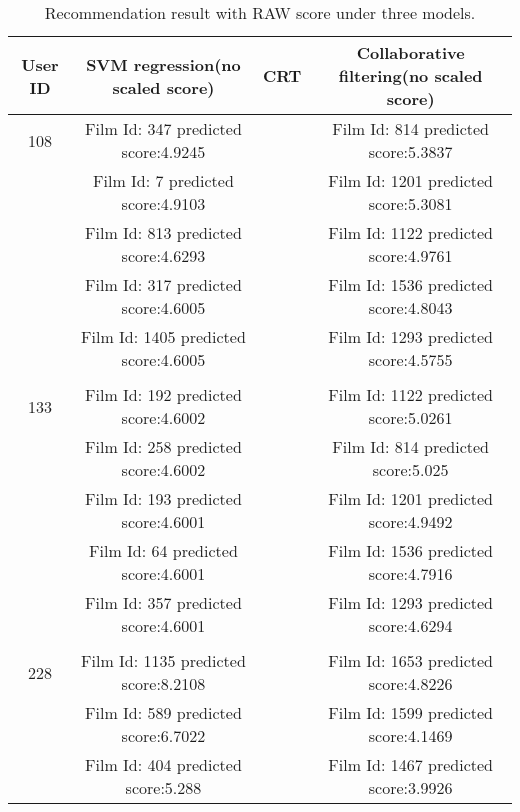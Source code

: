 \begin{longtable}{|c|c|c|c|}
\caption{Recommendation result with RAW score under three models.}\\
\hline
{User ID} & {\bf SVM regression(no scaled score)} & {\bf CRT} & {\bf Collaborative filtering(no scaled score)} \\
\hline
\multicolumn{ 1}{|c|}{108} & Film Id: 347 predicted score:4.9245 &            & Film Id: 814 predicted score:5.3837 \\
\hline
\multicolumn{ 1}{|c|}{} & Film Id: 7 predicted score:4.9103 &            & Film Id: 1201 predicted score:5.3081 \\
\hline
\multicolumn{ 1}{|c|}{} & Film Id: 813 predicted score:4.6293 &            & Film Id: 1122 predicted score:4.9761 \\
\hline
\multicolumn{ 1}{|c|}{} & Film Id: 317 predicted score:4.6005 &            & Film Id: 1536 predicted score:4.8043 \\
\hline
\multicolumn{ 1}{|c|}{} & Film Id: 1405 predicted score:4.6005 &            & Film Id: 1293 predicted score:4.5755 \\
\hline
           &            &            &            \\
\hline
\multicolumn{ 1}{|c|}{133} & Film Id: 192 predicted score:4.6002 &            & Film Id: 1122 predicted score:5.0261 \\
\hline
\multicolumn{ 1}{|c|}{} & Film Id: 258 predicted score:4.6002 &            & Film Id: 814 predicted score:5.025 \\
\hline
\multicolumn{ 1}{|c|}{} & Film Id: 193 predicted score:4.6001 &            & Film Id: 1201 predicted score:4.9492 \\
\hline
\multicolumn{ 1}{|c|}{} & Film Id: 64 predicted score:4.6001 &            & Film Id: 1536 predicted score:4.7916 \\
\hline
\multicolumn{ 1}{|c|}{} & Film Id: 357 predicted score:4.6001 &            & Film Id: 1293 predicted score:4.6294 \\
\hline
           &            &            &            \\
\hline
\multicolumn{ 1}{|c|}{228} & Film Id: 1135 predicted score:8.2108 &            & Film Id: 1653 predicted score:4.8226 \\
\hline
\multicolumn{ 1}{|c|}{} & Film Id: 589 predicted score:6.7022 &            & Film Id: 1599 predicted score:4.1469 \\
\hline
\multicolumn{ 1}{|c|}{} & Film Id: 404 predicted score:5.288 &            & Film Id: 1467 predicted score:3.9926 \\

\end{longtable}
